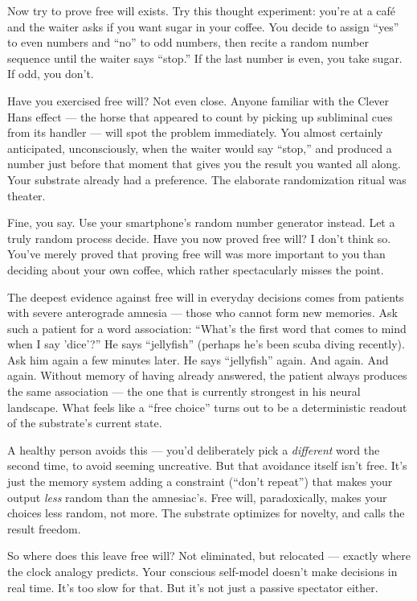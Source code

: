 \documentclass[11pt, twoside, openright]{book}
\begin{document}
Now try to prove free will exists. Try this thought experiment: you're at a café and the waiter asks if you want sugar in your coffee. You decide to assign ``yes'' to even numbers and ``no'' to odd numbers, then recite a random number sequence until the waiter says ``stop.'' If the last number is even, you take sugar. If odd, you don't.

Have you exercised free will? Not even close. Anyone familiar with the Clever Hans effect --- the horse that appeared to count by picking up subliminal cues from its handler --- will spot the problem immediately. You almost certainly anticipated, unconsciously, when the waiter would say ``stop,'' and produced a number just before that moment that gives you the result you wanted all along. Your substrate already had a preference. The elaborate randomization ritual was theater.

Fine, you say. Use your smartphone's random number generator instead. Let a truly random process decide. Have you now proved free will? I don't think so. You've merely proved that proving free will was more important to you than deciding about your own coffee, which rather spectacularly misses the point.

The deepest evidence against free will in everyday decisions comes from patients with severe anterograde amnesia --- those who cannot form new memories. Ask such a patient for a word association: ``What's the first word that comes to mind when I say 'dice'?'' He says ``jellyfish'' (perhaps he's been scuba diving recently). Ask him again a few minutes later. He says ``jellyfish'' again. And again. And again. Without memory of having already answered, the patient always produces the same association --- the one that is currently strongest in his neural landscape. What feels like a ``free choice'' turns out to be a deterministic readout of the substrate's current state.

A healthy person avoids this --- you'd deliberately pick a \textit{different} word the second time, to avoid seeming uncreative. But that avoidance itself isn't free. It's just the memory system adding a constraint (``don't repeat'') that makes your output \textit{less} random than the amnesiac's. Free will, paradoxically, makes your choices less random, not more. The substrate optimizes for novelty, and calls the result freedom.

So where does this leave free will? Not eliminated, but relocated --- exactly where the clock analogy predicts. Your conscious self-model doesn't make decisions in real time. It's too slow for that. But it's not just a passive spectator either.
\end{document}
